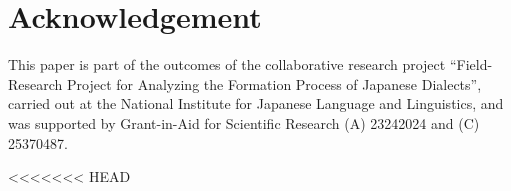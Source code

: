 \documentclass[output=paper]{LSP/langsci}
\begin{document}
\section*{Acknowledgement}

This paper is part of the outcomes of the collaborative research project “Field-Research Project for Analyzing the Formation Process of Japanese Dialects”, carried out at the National Institute for Japanese Language and Linguistics, and was supported by Grant-in-Aid for Scientific Research (A) 23242024 and (C) 25370487.

\printbibliography[heading=subbibliography,notkeyword=this]
<<<<<<< HEAD
\end{document}
